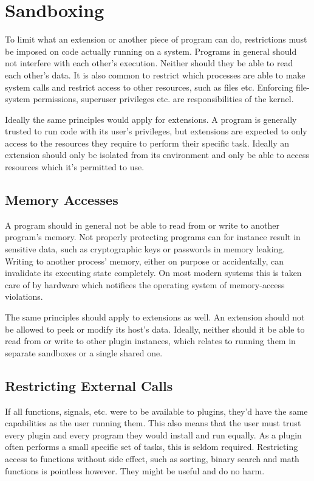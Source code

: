 \chapter {Sandboxing}

To limit what an extension or another piece of program can do, restrictions
must be imposed on code actually running on a system. Programs in general
should not interfere with each other's execution. Neither should they be able
to read each other's data. It is also common to restrict which processes are
able to make system calls and restrict access to other resources, such as files
etc. Enforcing file-system permissions, superuser privileges etc. are
responsibilities of the kernel.

Ideally the same principles would apply for extensions. A program is generally
trusted to run code with its user's privileges, but extensions are expected to
only access to the resources they require to perform their specific task.
Ideally an extension should only be isolated from its environment and only be
able to access resources which it's permitted to use.

\section {Memory Accesses}

A program should in general not be able to read from or write to another
program's memory. Not properly protecting programs can for instance result in
sensitive data, such as cryptographic keys or passwords in memory leaking.
Writing to another process' memory, either on purpose or accidentally, can
invalidate its executing state completely. On most modern systems this is taken
care of by hardware which notifices the operating system of memory-access
violations.

The same principles should apply to extensions as well. An extension should not
be allowed to peek or modify its host's data. Ideally, neither should it be
able to read from or write to other plugin instances, which relates to running
them in separate sandboxes or a single shared one.

\section {Restricting External Calls}

If all functions, signals, etc. were to be available to plugins, they'd have the
same capabilities as the user running them. This also means that the user must
trust every plugin and every program they would install and run equally. As a
plugin often performs a small specific set of tasks, this is seldom required.
Restricting access to functions without side effect, such as sorting, binary
search and math functions is pointless however. They might be useful and do no
harm.

